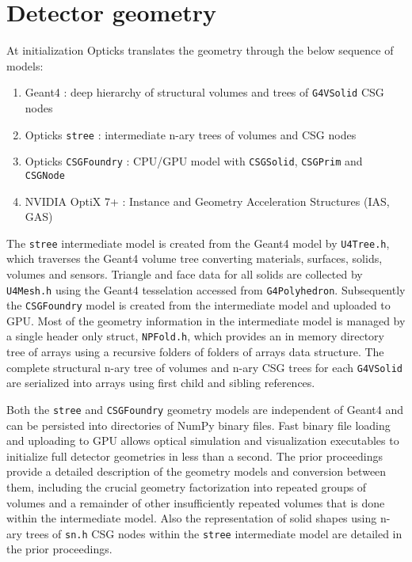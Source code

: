 \documentclass{webofc}
\begin{document}
\section{Detector geometry} 
\label{secgeom}%
At initialization Opticks translates the geometry through the below sequence of models:
%
\begin{enumerate}
\item Geant4 : deep hierarchy of structural volumes and trees of {\tt G4VSolid} CSG nodes
\item Opticks {\tt stree} : intermediate n-ary trees of volumes and CSG nodes
\item Opticks {\tt CSGFoundry} : CPU/GPU model with {\tt CSGSolid}, {\tt CSGPrim} and {\tt CSGNode} 
\item NVIDIA OptiX 7+ : Instance and Geometry Acceleration Structures (IAS, GAS)
\end{enumerate}  
%
The {\tt stree} intermediate model is created from the Geant4 model by {\tt U4Tree.h},
which traverses the Geant4 volume tree converting materials, surfaces, solids, volumes and sensors.
Triangle and face data for all solids are collected by {\tt U4Mesh.h} using 
the Geant4 tesselation accessed from {\tt G4Polyhedron}. 
Subsequently the {\tt CSGFoundry} model is created from the intermediate model and uploaded to GPU.   
Most of the geometry information in the intermediate model is managed by a single header only struct, {\tt NPFold.h}, 
which provides an in memory directory tree of arrays using a recursive folders of folders of arrays data structure.
The complete structural n-ary tree of volumes and n-ary CSG trees for each {\tt G4VSolid} 
are serialized into arrays using first child and sibling references.

Both the {\tt stree} and {\tt CSGFoundry} geometry models are independent of Geant4 and can be persisted into directories of NumPy\cite{numpy} binary files. 
Fast binary file loading and uploading to GPU allows optical simulation and visualization
executables to initialize full detector geometries in less than a second.  
The prior proceedings\cite{chep2023} provide a detailed description of the geometry models and conversion between them,
including the crucial geometry factorization into repeated groups of volumes and a remainder of 
other insufficiently repeated volumes that is done within the intermediate model.
Also the representation of solid shapes using n-ary trees of {\tt sn.h} CSG nodes within  
the {\tt stree} intermediate model are detailed in the prior proceedings. 
%
%
%
\end{document}
